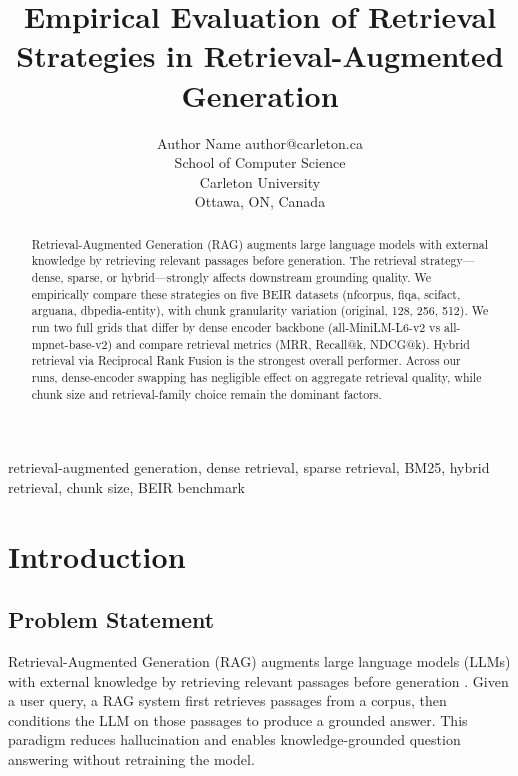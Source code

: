 \documentclass[twoside,11pt]{article}
\begin{document}
\title{Empirical Evaluation of Retrieval Strategies in Retrieval-Augmented Generation}

\author{\name Author Name \email author@carleton.ca \\
\addr School of Computer Science\\
Carleton University\\
Ottawa, ON, Canada}

\maketitle

\begin{abstract}
Retrieval-Augmented Generation (RAG) augments large language models with external knowledge by retrieving relevant passages before generation. The retrieval strategy---dense, sparse, or hybrid---strongly affects downstream grounding quality. We empirically compare these strategies on five BEIR datasets (nfcorpus, fiqa, scifact, arguana, dbpedia-entity), with chunk granularity variation (original, 128, 256, 512). We run two full grids that differ by dense encoder backbone (all-MiniLM-L6-v2 vs all-mpnet-base-v2) and compare retrieval metrics (MRR, Recall@k, NDCG@k). Hybrid retrieval via Reciprocal Rank Fusion is the strongest overall performer. Across our runs, dense-encoder swapping has negligible effect on aggregate retrieval quality, while chunk size and retrieval-family choice remain the dominant factors.
\end{abstract}

\begin{keywords}
retrieval-augmented generation, dense retrieval, sparse retrieval, BM25, hybrid retrieval, chunk size, BEIR benchmark
\end{keywords}

\section{Introduction}

\subsection{Problem Statement}

Retrieval-Augmented Generation (RAG) augments large language models (LLMs) with external knowledge by retrieving relevant passages before generation \citep{lewis2020rag}. Given a user query, a RAG system first retrieves passages from a corpus, then conditions the LLM on those passages to produce a grounded answer. This paradigm reduces hallucination and enables knowledge-grounded question answering without retraining the model.
\end{document}
